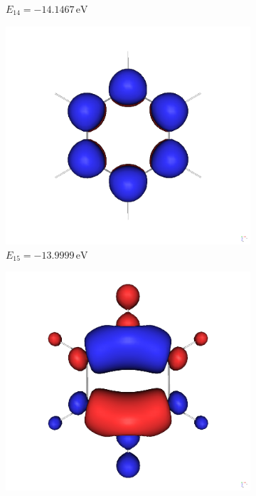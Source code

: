 \documentclass[9pt]{report}
\begin{document}
\begin{figure}[H]
\begin{subfigure}[b]{0.23\textwidth}
		\caption[]{{\small $E_{14}=-14.1467\,\mathrm{eV}$}}    
	\end{subfigure}
	\begin{subfigure}[b]{0.23\textwidth}   
		\centering 
		\includegraphics[width=\textwidth]{Benzol-15.png}
		\caption[]{{\small $E_{15}=-13.9999\,\mathrm{eV}$}}    
	\end{subfigure}
	\hfill
	\begin{subfigure}[b]{0.23\textwidth}   
		\centering 
		\includegraphics[width=\textwidth]{Benzol-16.png}

\end{subfigure}
\end{figure}
\end{document}
